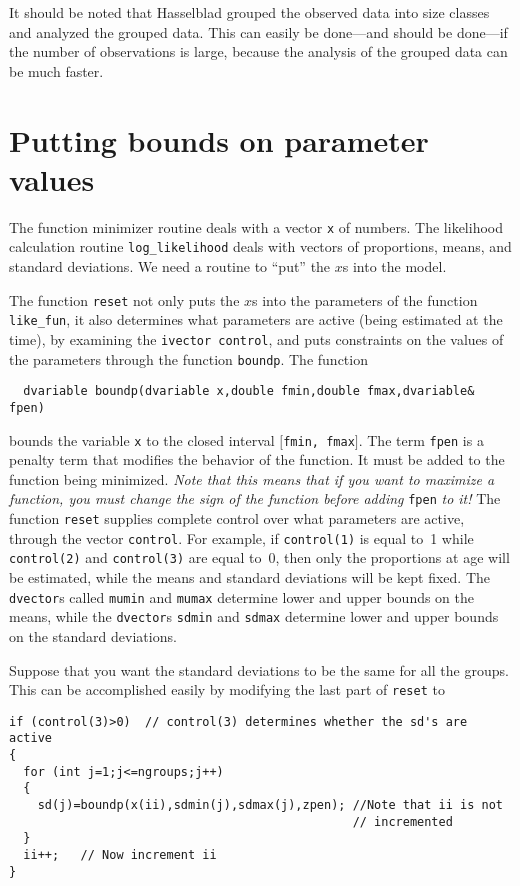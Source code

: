 \documentclass{admbmanual}
\begin{document}
It should be noted that Hasselblad grouped the observed data into size classes
and analyzed the grouped data. This can easily be done---and should be done---if the number of observations is large, because the analysis of the grouped
data can be much faster.


\section{Putting bounds on parameter values}

The function minimizer routine deals with a vector \texttt{x}
of numbers. The likelihood calculation routine 
\texttt{log\_likelihood} deals with vectors of proportions, means,
and standard deviations. We need a routine to ``put'' the $x$s
into the model.


The function \texttt{reset} not only puts the $x$s into the parameters of the function \texttt{like\_fun}, it also determines what parameters
are active (being estimated at the time), by examining the
\texttt{ivector control}, and puts constraints on the values of the
parameters through the function \texttt{boundp}.
The function
\begin{lstlisting}
  dvariable boundp(dvariable x,double fmin,double fmax,dvariable& fpen)
\end{lstlisting}
bounds the variable \texttt{x} to the closed interval 
$[$\texttt{fmin, fmax}$]$.
The term \texttt{fpen} is a penalty term that modifies the behavior of the
function. It must be added to the function being minimized.
\textit{Note that this means that if you want to maximize a function, you must
change the sign of the function before adding} \texttt{fpen} \textit{to it!} 
The function \texttt{reset} supplies complete control over what parameters
are active, through the vector \texttt{control}.  For example,
if \texttt{control(1)} is equal to~1 while \texttt{control(2)} and 
\texttt{control(3)} are equal to~0, then only the proportions at age will
be estimated, while the means and standard deviations will be kept fixed.
The \texttt{dvector}s called \texttt{mumin} and \texttt{mumax} determine lower and upper
bounds on the means, while 
the \texttt{dvector}s \texttt{sdmin} and \texttt{sdmax} determine lower and upper
bounds on the standard deviations. 

Suppose that you want the standard deviations to be the same for all the
groups. This can be accomplished easily by modifying the last part of 
\texttt{reset} to
\begin{lstlisting}
if (control(3)>0)  // control(3) determines whether the sd's are active
{
  for (int j=1;j<=ngroups;j++)    
  {
    sd(j)=boundp(x(ii),sdmin(j),sdmax(j),zpen); //Note that ii is not
                                                // incremented
  }
  ii++;   // Now increment ii
}
\end{lstlisting}
\end{document}
